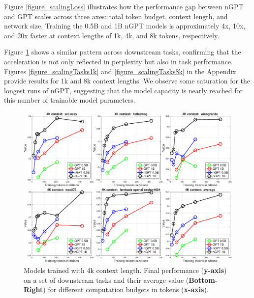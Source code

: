 \documentclass{article} %
\begin{document}
Figure \ref{figure_scalingLoss} illustrates how the performance gap between nGPT and GPT scales across three axes: total token budget, context length, and network size. Training the 0.5B and 1B nGPT models is approximately 4x, 10x, and 20x faster at context lengths of 1k, 4k, and 8k tokens, respectively. 


Figure \ref{figure_scalingTasks4k} shows a similar pattern across downstream tasks, confirming that the acceleration is not only reflected in perplexity but also in task performance. Figures \ref{figure_scalingTasks1k} and \ref{figure_scalingTasks8k} in the Appendix provide results for 1k and 8k context lengths. We observe some saturation for the longest runs of nGPT, suggesting that the model capacity is nearly reached for this number of trainable model parameters.


\FloatBarrier %

\begin{figure}[!t]
\begin{center}
    \includegraphics[width=1.0\textwidth]{4Ktasks.eps} 
\caption{\label{fig:f1} Models trained with 4k context length. Final performance (\textbf{y-axis}) on a set of downstream tasks and their average value (\textbf{Bottom-Right}) for different computation budgets in tokens (\textbf{x-axis}).}
\label{figure_scalingTasks4k}
\end{center}
\end{figure}
\end{document}
